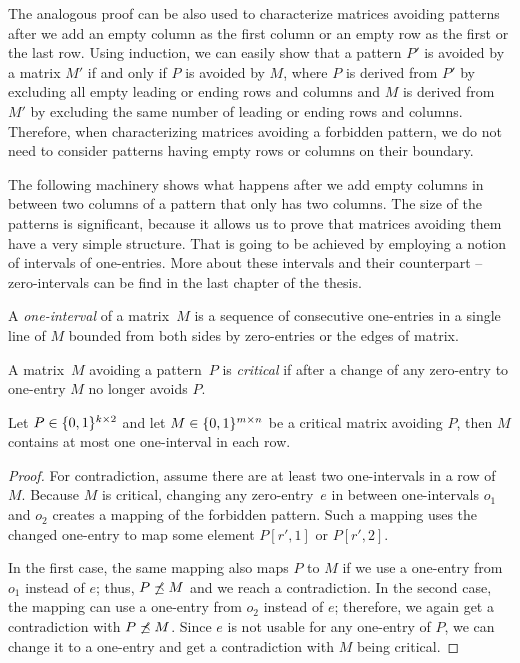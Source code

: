 The analogous proof can be also used to characterize matrices avoiding patterns after we add an empty column as the first column or an empty row as the first or the last row. Using induction, we can easily show that a pattern $P'$ is avoided by a matrix $M'$ if and only if $P$ is avoided by $M$, where $P$ is derived from $P'$ by excluding all empty leading or ending rows and columns and $M$ is derived from $M'$ by excluding the same number of leading or ending rows and columns. Therefore, when characterizing matrices avoiding a forbidden pattern, we do not need to consider patterns having empty rows or columns on their boundary.

The following machinery shows what happens after we add empty columns in between two columns of a pattern that only has two columns. The size of the patterns is significant, because it allows us to prove that matrices avoiding them have a very simple structure. That is going to be achieved by employing a notion of intervals of one-entries. More about these intervals and their counterpart -- zero-intervals can be find in the last chapter of the thesis.

\begin{defn}
A \emph{one-interval} of a matrix~$M$ is a sequence of consecutive one-entries in a single line of $M$ bounded from both sides by zero-entries or the edges of matrix.
\end{defn}

\begin{defn}
A matrix~$M$ avoiding a pattern~$P$ is \emph{critical} if after a change of any zero-entry to one-entry $M$ no longer avoids $P$.
\end{defn}

\begin{lemma}
\label{lemma:twocols}
Let $P\in\{0,1\}^{k\times2}$ and let $M\in\{0,1\}^{m\times n}$ be a critical matrix avoiding $P$, then $M$ contains at most one one-interval in each row.
\end{lemma}
\begin{proof}
For contradiction, assume there are at least two one-intervals in a row of $M$. Because $M$ is critical, changing any zero-entry~$e$ in between one-intervals $o_1$ and $o_2$ creates a mapping of the forbidden pattern. Such a mapping uses the changed one-entry to map some element $P[r',1]$ or $P[r',2]$.

In the first case, the same mapping also maps $P$ to $M$ if we use a one-entry from $o_1$ instead of $e$; thus, $P\not\preceq M$ and we reach a contradiction. In the second case, the mapping can use a one-entry from $o_2$ instead of $e$; therefore, we again get a contradiction with $P\not\preceq M$. Since $e$ is not usable for any one-entry of $P$, we can change it to a one-entry and get a contradiction with $M$ being critical.
\end{proof}

